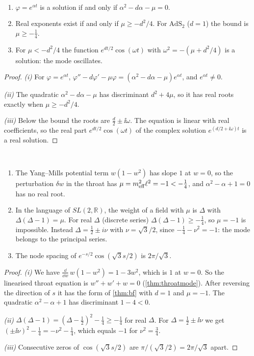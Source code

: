 \begin{theorem}[BF bound]\label{thm:bf}\ver\
\begin{enumerate}[label=(\roman*)]
\item $\varphi=e^{\alpha t}$ is a solution if and only if $\alpha^2-d\alpha-\mu=0$.
\item Real exponents exist if and only if $\mu\ge-d^2/4$. For $\mathrm{AdS}_2$ ($d=1$) the bound is $\mu\ge-\frac14$.
\item For $\mu<-d^2/4$ the function $e^{dt/2}\cos(\omega t)$ with $\omega^2=-(\mu+d^2/4)$ is a solution: the mode oscillates.
\end{enumerate}
\end{theorem}
\begin{proof}
\emph{(i)} For $\varphi=e^{\alpha t}$, $\varphi''-d\varphi'-\mu\varphi=(\alpha^2-d\alpha-\mu)e^{\alpha t}$, and $e^{\alpha t}\ne0$.

\emph{(ii)} The quadratic $\alpha^2-d\alpha-\mu$ has discriminant $d^2+4\mu$, so it has real roots exactly when $\mu\ge-d^2/4$.

\emph{(iii)} Below the bound the roots are $\frac d2\pm\ii\omega$. The equation is linear with real coefficients, so the real part $e^{dt/2}\cos(\omega t)$ of the complex solution $e^{(d/2+\ii\omega)t}$ is a real solution.
\end{proof}


\begin{proposition}[The throat's Yang--Mills mode]\label{prop:throatbf}\ver\
\begin{enumerate}[label=(\roman*)]
\item The Yang--Mills potential term $w(1-w^2)$ has slope $1$ at $w=0$, so the perturbation $\delta w$ in the throat has $\mu=m_{\rm eff}^2\ell^2=-1<-\frac14$, and $\alpha^2-\alpha+1=0$ has no real root.
\item In the language of $SL(2,\mathbb R)$, the weight of a field with $\mu$ is $\Delta$ with $\Delta(\Delta-1)=\mu$. For real $\Delta$ (discrete series) $\Delta(\Delta-1)\ge-\frac14$, so $\mu=-1$ is impossible. Instead $\Delta=\frac12\pm i\nu$ with $\nu=\sqrt3/2$, since $-\frac14-\nu^2=-1$: the mode belongs to the principal series.
\item The node spacing of $e^{-s/2}\cos(\sqrt3s/2)$ is $2\pi/\sqrt3$.
\end{enumerate}
\end{proposition}
\begin{proof}
\emph{(i)} We have $\frac{\dd}{\dd w}\,w(1-w^2)=1-3w^2$, which is $1$ at $w=0$. So the linearised throat equation is $w''+w'+w=0$ (\cref{thm:throatmode}). After reversing the direction of $s$ it has the form of \cref{thm:bf} with $d=1$ and $\mu=-1$. The quadratic $\alpha^2-\alpha+1$ has discriminant $1-4<0$.

\emph{(ii)} $\Delta(\Delta-1)=(\Delta-\frac12)^2-\frac14\ge-\frac14$ for real $\Delta$. For $\Delta=\frac12\pm\ii\nu$ we get $(\pm\ii\nu)^2-\frac14=-\nu^2-\frac14$, which equals $-1$ for $\nu^2=\frac34$.

\emph{(iii)} Consecutive zeros of $\cos(\sqrt3s/2)$ are $\pi/(\sqrt3/2)=2\pi/\sqrt3$ apart.
\end{proof}


